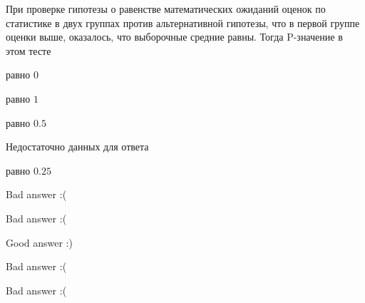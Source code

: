 
\begin{question}
При проверке гипотезы о равенстве математических ожиданий оценок по
статистике в двух группах против альтернативной гипотезы, что в первой
группе оценки выше, оказалось, что выборочные средние равны. Тогда
P-значение в этом тесте
\begin{answerlist}
  \item равно \(0\)
  \item равно \(1\)
  \item равно \(0.5\)
  \item Недостаточно данных для ответа
  \item равно \(0.25\)
\end{answerlist}
\end{question}

\begin{solution}
\begin{answerlist}
  \item Bad answer :(
  \item Bad answer :(
  \item Good answer :)
  \item Bad answer :(
  \item Bad answer :(
\end{answerlist}
\end{solution}

